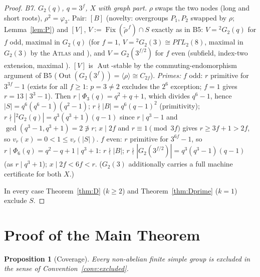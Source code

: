 \documentclass[11pt]{amsart}
\newtheorem{proposition}[theorem]{Proposition}
\theoremstyle{definition}
\theoremstyle{remark}
\DeclareMathOperator{\Aut}{Aut}
\DeclareMathOperator{\Out}{Out}
\DeclareMathOperator{\Fix}{Fix}
\newcommand{\vp}[1]{v_{#1}}
\begin{document}
\begin{proof}
\emph{B7. $G_2(q)$, $q=3^f$, $X$ with graph part.} $\rho$ swaps the two
nodes (long and short roots), $\rho^2=\varphi_3$. Pair: $[B]$ (novelty:
overgroups $P_1,P_2$ swapped by $\rho$; Lemma~\ref{lem:P}) and $[V]$,
$V:=\Fix(\tilde\rho^{\,f})\cap S$ exactly as in B5: $V={}^2G_2(q)$ for
$f$ odd, maximal in $G_2(q)$ \cite{Kleidman1988} (for $f=1$,
$V={}^2G_2(3)\cong P\Gamma L_2(8)$, maximal in $G_2(3)$ by the \textsc{Atlas}
and \cite{Kleidman1988}), and $V=G_2(3^{f/2})$ for $f$ even (subfield,
index-two extension, maximal \cite{Kleidman1988}). $[V]$ is
$\Aut$-stable by the commuting-endomorphism argument of B5
($\Out(G_2(3^f))=\langle\rho\rangle\cong C_{2f}$). \emph{Primes:} $f$
odd: $r$ primitive for $3^{3f}-1$ (exists for all $f\geq1$: $p=3\neq2$
excludes the $2^6$ exception; $f=1$ gives $r=13\mid3^3-1$). Then
$r\mid\Phi_3(q)=q^2+q+1$, which divides $q^6-1$, hence
$|S|=q^6(q^6-1)(q^2-1)$; $r\nmid|B|=q^6(q-1)^2$ (primitivity);
$r\nmid|{}^2G_2(q)|=q^3(q^3+1)(q-1)$ since $r\mid q^3-1$ and
$\gcd(q^3-1,q^3+1)=2\not\ni r$; $x\mid2f$ and $r\equiv1\pmod{3f}$ gives
$r\geq3f+1>2f$, so $\vp{r}(x)=0<1\leq\vp{r}(|S|)$. $f$ even: $r$
primitive for $3^{6f}-1$, so $r\mid\Phi_6(q)=q^2-q+1\mid q^3+1$:
$r\nmid|B|$; $r\nmid|G_2(3^{f/2})|=q^3(q^3-1)(q-1)$ (as $r\mid q^3+1$);
$x\mid2f<6f<r$. ($G_2(3)$ additionally carries a full machine
certificate for both $X$.)

In every case Theorem~\ref{thm:D} ($k\geq2$) and
Theorem~\ref{thm:Dprime} ($k=1$) exclude $S$.
\end{proof}

\section{Proof of the Main Theorem}\label{sec:proof}

\begin{proposition}[Coverage]\label{prop:coverage}
Every non-abelian finite simple group is excluded in the sense of
Convention~\ref{conv:excluded}.
\end{proposition}
\end{document}
